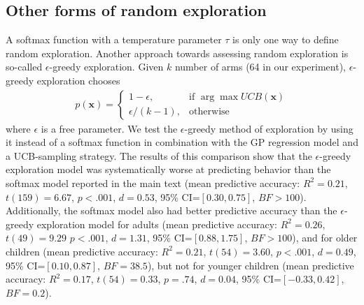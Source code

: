\subsection*{Other forms of random exploration}
A softmax function with a temperature parameter $\tau$ is only one way to define random exploration. Another approach towards assessing random exploration is so-called $\epsilon$-greedy exploration. Given $k$ number of arms (64 in our experiment), $\epsilon$-greedy exploration chooses
\begin{align}
p(\mathbf{x}) = 
\begin{cases}
 1-\epsilon, &\text{if } \arg\max UCB(\mathbf{x})\\
\epsilon/(k-1), &\text{otherwise}
\end{cases}
\end{align}
where $\epsilon$ is a free parameter. We test the $\epsilon$-greedy method of exploration by using it instead of a softmax function in combination with the GP regression model and a UCB-sampling strategy. The results of this comparison show that the $\epsilon$-greedy exploration model was systematically worse at predicting behavior than the softmax model reported in the main text (mean predictive accuracy: $R^2=0.21$, $t(159)=6.67$, $p<.001$, $d=0.53$, 95\% CI=$[0.30, 0.75]$, $BF>100$). Additionally, the softmax model also had better predictive accuracy than the $\epsilon$-greedy exploration model for adults (mean predictive accuracy: $R^2=0.26$, $t(49)=9.29$ $p<.001$, $d=1.31$, 95\% CI=$[0.88, 1.75]$, $BF>100$), and for older children (mean predictive accuracy: $R^2=0.21$, $t(54)=3.60$, $p<.001$, $d=0.49$, 95\% CI=$[0.10, 0.87]$, $BF=38.5$), but not for younger children (mean predictive accuracy: $R^2=0.17$, $t(54)=0.33$, $p=.74$, $d=0.04$, 95\% CI=$[-0.33, 0.42]$, $BF=0.2$).

